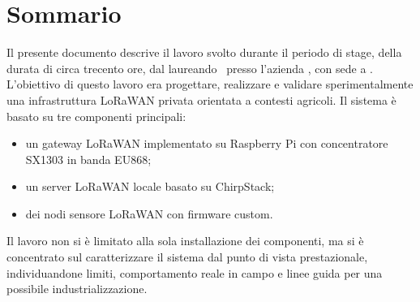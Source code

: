 \cleardoublepage
{}
{}
\begingroup
\let\clearpage\relax
\let\cleardoublepage\relax
\let\cleardoublepage\relax

\chapter*{Sommario}
Il presente documento descrive il lavoro svolto durante il periodo di stage, della durata di circa trecento ore, dal laureando \myName\ presso l'azienda \myCompany, con sede a \myCompanyCity.\\
L'obiettivo di questo lavoro era progettare, realizzare e validare sperimentalmente una infrastruttura LoRaWAN privata orientata a contesti agricoli. 
Il sistema è basato su tre componenti principali:
\begin{itemize}
    \item un gateway LoRaWAN implementato su Raspberry Pi con concentratore SX1303 in banda EU868;
    \item un server LoRaWAN locale basato su ChirpStack;
    \item dei nodi sensore LoRaWAN con firmware custom.
\end{itemize}
Il lavoro non si è limitato alla sola installazione dei componenti, ma si è concentrato sul caratterizzare il sistema dal punto di vista prestazionale, individuandone limiti, comportamento reale in campo e linee guida per una
possibile industrializzazione.






\endgroup

\vfill
